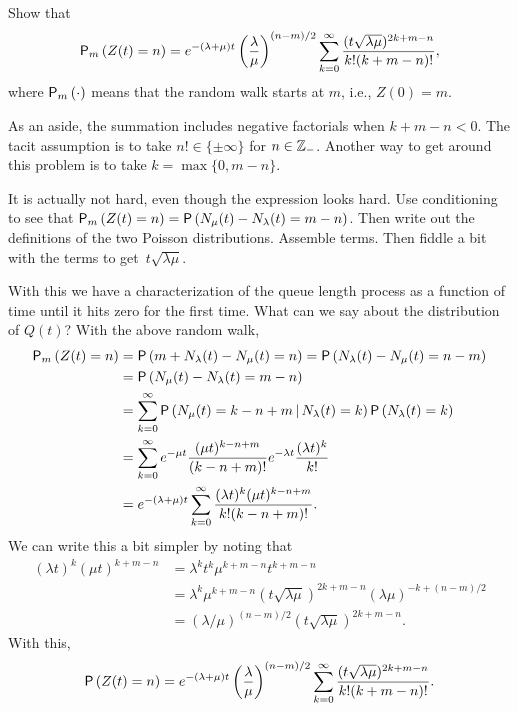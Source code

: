 \begin{exercise}  
Show that
\begin{equation*}
    \P{Z(t)=n}_m 
= e^{-(\lambda+\mu)t} \left(\frac\lambda\mu\right)^{(n-m)/2} \sum_{k=0}^\infty 
\frac{(t\sqrt{\lambda\mu} )^{2k+m-n}}{k!(k+m-n)!},
\end{equation*}
where $\P{\cdot}_m$ means that the random walk starts at $m$, i.e.,
$Z(0)=m$.

As an aside, the summation includes negative factorials when
$k+m-n<0$. The tacit assumption is to take $n!\in \{\pm \infty\}$ for
$n\in \mathbb{Z}_-$. Another way to get around this problem is to take
$k=\max\{0, m-n\}$.
\begin{hint}
It is actually not hard, even though the expression looks
  hard. Use conditioning to see that
  $\P{Z(t)=n}_m = \P{N_\mu(t) - N_\lambda(t) = m - n}$. Then write out
  the definitions of the two Poisson distributions. Assemble
  terms. Then fiddle a bit with the terms to get~$t\sqrt{\lambda\mu}$. 
\end{hint}
\begin{solution}
With this we have a characterization of the queue length process as a
function of time until it hits zero for the first time. What can we
say about the distribution of $Q(t)$? With the above random walk, 
\begin{equation}\label{eq:29}
  \begin{split}
    \P{Z(t)=n}_m
&= \P{m+N_\lambda(t) - N_\mu(t) = n }  = \P{N_\lambda(t) - N_\mu(t) = n-m }  \\
&= \P{N_\mu(t) - N_\lambda(t) = m-n }  \\
&= \sum_{k=0}^\infty \P{N_\mu(t) = k - n + m\given N_\lambda(t) = k } \P{N_\lambda(t)=k}\\
&= \sum_{k=0}^\infty e^{-\mu t} \frac{(\mu t)^{k -n+m}}{(k-n +m)!} e^{-\lambda t} \frac{(\lambda t)^k}{k!} \\
&= e^{-(\lambda+\mu)t} \sum_{k=0}^\infty \frac{(\lambda t)^k(\mu t)^{k  -n + m }}{k!(k-n+m)!}.
  \end{split}
\end{equation}
We can write this a bit simpler by noting that
\begin{align*}
  (\lambda t)^k (\mu t) ^{k + m - n}  
&=  \lambda^k t^k\mu^{k + m - n} t^{k+m-n} \\
&= \lambda^k \mu^{k + m - n} (t\sqrt{\lambda \mu})^{2k+m-n} (\lambda\mu)^{-k + (n-m)/2} \\
&= (\lambda/\mu)^{(n-m)/2} (t\sqrt{\lambda \mu})^{2k+m-n}.
\end{align*}
With this,
\begin{equation*}
    \P{Z(t)=n} 
= e^{-(\lambda+\mu)t} \left(\frac\lambda\mu\right)^{(n-m)/2} \sum_{k=0}^\infty 
\frac{(t\sqrt{\lambda\mu} )^{2k+m-n}}{k!(k+m-n)!}.
\end{equation*}
\end{solution}
\end{exercise}


